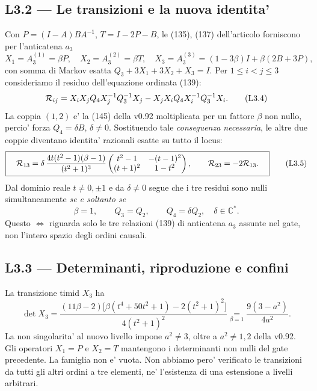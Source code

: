 \documentclass[11pt,a4paper]{article}
\begin{document}
\subsection*{L3.2 --- Le transizioni e la nuova identita'}
Con $P=(I-A)BA^{-1}$, $T=I-2P-B$, le (135), (137) dell'articolo forniscono per l'anticatena $a_3$
\begin{equation}
 X_1=A_3^{(1)}=\beta P,\quad X_2=A_3^{(2)}=\beta T,\quad
 X_3=A_3^{(3)}=(1-3\beta)I+\beta(2B+3P),
 \tag{L3.3}
\end{equation}
con somma di Markov esatta $Q_3+3X_1+3X_2+X_3=I$. Per $1\le i<j\le3$ consideriamo il residuo dell'equazione ordinata (139):
\begin{equation}
 {\cal R}_{ij}=X_iX_jQ_4X_j^{-1}Q_3^{-1}X_j-X_jX_iQ_4X_i^{-1}Q_3^{-1}X_i.
 \tag{L3.4}
\end{equation}
La coppia $(1,2)$ e' la (145) della v0.92 moltiplicata per un fattore $\beta$ non nullo, percio' forza $Q_4=\delta B$, $\delta\ne0$. Sostituendo tale \emph{conseguenza necessaria}, le altre due coppie diventano identita' razionali esatte su tutto il locus:
\begin{equation}
 \boxed{\quad {\cal R}_{13}=\delta\,\frac{4t(t^2-1)(\beta-1)}{(t^2+1)^3}
 \begin{pmatrix}t^2-1&-(t-1)^2\\(t+1)^2&1-t^2\end{pmatrix},\qquad
 {\cal R}_{23}=-2{\cal R}_{13}.\quad}
 \tag{L3.5}
\end{equation}
Dal dominio reale $t\ne0,\pm1$ e da $\delta\ne0$ segue che i tre residui sono nulli simultaneamente \emph{se e soltanto se}
\begin{equation}
 \boxed{\quad\beta=1,\qquad Q_3=Q_2,\qquad Q_4=\delta Q_2,\quad\delta\in\mathbb C^*.\quad}
 \tag{L3.6}
\end{equation}
Questo $\Leftrightarrow$ riguarda solo le tre relazioni (139) di anticatena $a_3$ assunte nel gate, non l'intero spazio degli ordini causali.

\clearpage
\subsection*{L3.3 --- Determinanti, riproduzione e confini}
La transizione timid $X_3$ ha
\begin{equation}
 \det X_3=\frac{(11\beta-2)\bigl[\beta(t^4+50t^2+1)-2(t^2+1)^2\bigr]}{4(t^2+1)^2}
 \underset{\beta=1}{=}\frac{9(3-a^2)}{4a^2}.
 \tag{L3.7}
\end{equation}
La non singolarita' al nuovo livello impone $a^2\ne3$, oltre a $a^2\ne1,2$ della v0.92. Gli operatori $X_1=P$ e $X_2=T$ mantengono i determinanti non nulli del gate precedente. La famiglia non e' vuota. Non abbiamo pero' verificato le transizioni da tutti gli altri ordini a tre elementi, ne' l'esistenza di una estensione a livelli arbitrari.
\end{document}
